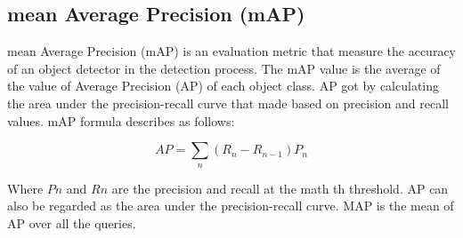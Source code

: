 \subsection{mean Average Precision (mAP)}

mean Average Precision (mAP) is an evaluation metric that
measure the accuracy of an object detector in the detection process.
The mAP value is the average of
the value of Average Precision (AP) of each object class. AP got
by calculating the area under the precision-recall curve that
made based on precision and recall values. mAP formula describes as follows:

\begin{equation}
  AP = \sum_n (R_n - R_{n-1}) P_n
  \label{map}
\end{equation}

Where $Pn$ and $Rn$ are the precision and recall at the math th threshold. AP can also be regarded as the area under the precision-recall curve. MAP is the mean of AP over all the queries.



